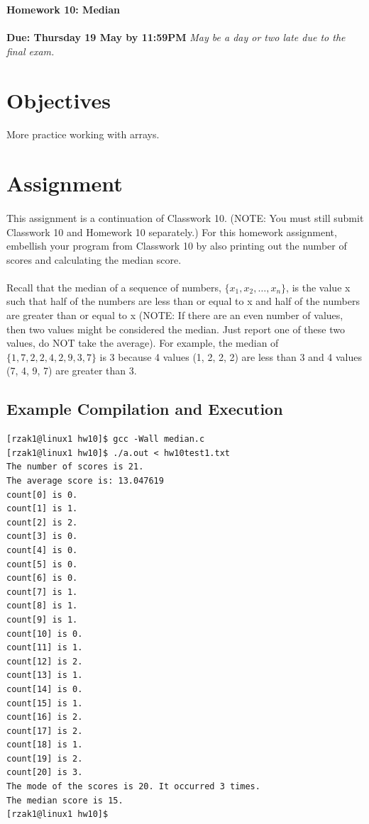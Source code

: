 \documentclass[letter,11pt]{article}
\begin{document}
\huge
\textbf{Homework 10: Median}
\normalsize
\\ ~~ \\
\textbf{Due: Thursday 19 May by 11:59PM}
\textit{May be a day or two late due to the final exam.}

\section*{Objectives}
\paragraph{}More practice working with arrays.

\section*{Assignment}
\paragraph{}This assignment is a continuation of Classwork 10. (NOTE: You must still submit Classwork 10 and Homework 10 separately.) For this homework assignment, embellish your program from Classwork 10 by also printing out the number of scores and calculating the median score.

\paragraph{}Recall that the median of a sequence of numbers, $\{x_1, x_2, \ldots, x_n\}$, is the value x such that half of the numbers are less than or equal to x and half of the numbers are greater than or equal to x (NOTE: If there are an even number of values, then two values might be considered the median. Just report one of these two values, do NOT take the average). For example, the median of $\{1, 7, 2, 2, 4, 2, 9, 3, 7\}$ is 3 because 4 values (1, 2, 2, 2) are less than 3 and 4 values (7, 4, 9, 7) are greater than 3.

\subsection*{Example Compilation and Execution}
\begin{verbatim}
[rzak1@linux1 hw10]$ gcc -Wall median.c
[rzak1@linux1 hw10]$ ./a.out < hw10test1.txt
The number of scores is 21.
The average score is: 13.047619
count[0] is 0.
count[1] is 1.
count[2] is 2.
count[3] is 0.
count[4] is 0.
count[5] is 0.
count[6] is 0.
count[7] is 1.
count[8] is 1.
count[9] is 1.
count[10] is 0.
count[11] is 1.
count[12] is 2.
count[13] is 1.
count[14] is 0.
count[15] is 1.
count[16] is 2.
count[17] is 2.
count[18] is 1.
count[19] is 2.
count[20] is 3.
The mode of the scores is 20. It occurred 3 times.
The median score is 15.
[rzak1@linux1 hw10]$
\end{verbatim}
\end{document}
